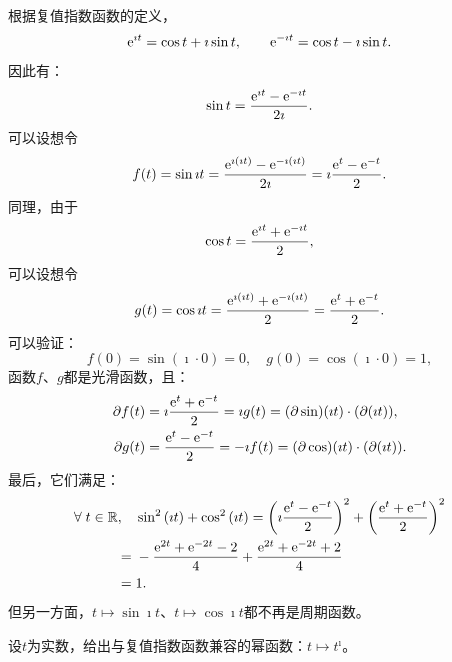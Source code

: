 \documentclass[12pt,UTF8]{ctexbook}
\begin{document}
\begin{so}
    根据复值指数函数的定义，
    $$ \mathrm{e}^{\imath t} = \cos{t} + \imath \sin{t}, \qquad \mathrm{e}^{-\imath t} = \cos{t} - \imath \sin{t}. $$
    因此有：
    $$ \sin{t} = \frac{\mathrm{e}^{\imath t} - \mathrm{e}^{-\imath t}}{2\imath}.$$
    可以设想令
    $$ f(t) = \sin{\imath t} = \frac{\mathrm{e}^{\imath (\imath t)} - \mathrm{e}^{-\imath (\imath t)}}{2\imath} = \imath \frac{\mathrm{e}^{t} - \mathrm{e}^{-t}}{2}.$$
    同理，由于
    $$ \cos{t} = \frac{\mathrm{e}^{\imath t} + \mathrm{e}^{-\imath t}}{2},$$
    可以设想令
    $$ g(t) = \cos{\imath t} = \frac{\mathrm{e}^{\imath (\imath t)} + \mathrm{e}^{-\imath (\imath t)}}{2} = \frac{\mathrm{e}^{t} + \mathrm{e}^{-t}}{2}.$$
    可以验证：
    $$ f(0) = \sin{(\imath \cdot 0)} = 0, \quad g(0)=\cos{(\imath \cdot 0)} = 1,$$
    函数$f$、$g$都是光滑函数，且：
    \begin{align*}
        \partial f(t) &= \imath \frac{\mathrm{e}^{t} + \mathrm{e}^{-t}}{2} = \imath g(t) = (\partial\sin)(\imath t)\cdot (\partial(\imath t)), \\
        \partial g(t) &= \frac{\mathrm{e}^{t} - \mathrm{e}^{-t}}{2} = -\imath f(t) = (\partial\cos)(\imath t)\cdot (\partial(\imath t)).
    \end{align*}
    最后，它们满足：
    \begin{align*}
        \forall \; t\in \mathbb{R}, \quad & \sin^2{(\imath t)} + \cos^2{(\imath t)} = \left(\imath \frac{\mathrm{e}^{t} - \mathrm{e}^{-t}}{2}\right)^2 + \left( \frac{\mathrm{e}^{t} + \mathrm{e}^{-t}}{2}\right)^2 \\
        =\;& -\frac{\mathrm{e}^{2t} + \mathrm{e}^{-2t} - 2}{4} + \frac{\mathrm{e}^{2t} + \mathrm{e}^{-2t} + 2}{4} \\
        =\;& 1.
    \end{align*}
    但另一方面，$t\mapsto \sin{\imath t}$、$t\mapsto \cos{\imath t}$都不再是周期函数。

\end{so}

\begin{et}
    设$t$为实数，给出与复值指数函数兼容的幂函数：$t\mapsto t^{\imath}$。
\end{et}
\end{document}
